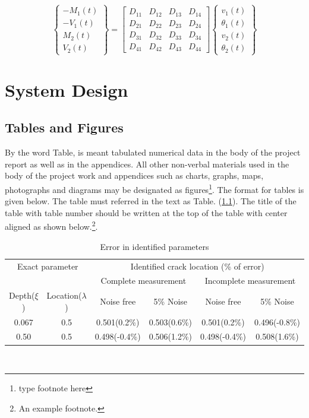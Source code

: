 \documentclass[BTech]{srmuthesis}
\begin{document}
\begin{equation}
\begin{Bmatrix}
-M_1(t)\\
-V_1(t)\\
M_2(t)\\
V_2(t)\end{Bmatrix}=\begin{bmatrix}
D_{11}&D_{12}&D_{13}&D_{14}\\
D_{21}&D_{22}&D_{23}&D_{24}\\
D_{31}&D_{32}&D_{33}&D_{34}\\
D_{41}&D_{42}&D_{43}&D_{44}\end{bmatrix}\begin{Bmatrix}
v_1(t)\\
\theta_1(t)\\
v_2(t)\\
\theta_2(t)\end{Bmatrix}
\label{eq:D}
\end{equation}
\chapter{System Design}
\section{Tables and Figures} 
 By the word Table, is meant tabulated numerical data in the body of the project report as well as in the appendices. All other non-verbal materials used in the body of the project work and appendices such as charts, graphs, maps, photographs and diagrams may be designated as figures\footnote{type footnote here}.
  The format for tables  is given below. The table must referred in the text as Table. (\ref{tab:frmcl}). The title of the table with table number should be written at the top of the table with center aligned as shown below.\footnote{An example footnote.}.
 \begin{table}[htpb]
      \centering
      \caption{Error in identified parameters}
      \begin{tabular}{|c|c|c|c|c|c|}
      	\hline
      	\multicolumn{2}{|c|}{Exact parameter} &               \multicolumn{4}{c|}{Identified crack location (\% of error)}               \\ \cline{3-6}
      	\multicolumn{2}{|c|}{}                & \multicolumn{2}{c|}{Complete measurement} & \multicolumn{2}{|c|}{Incomplete measurement} \\ \hline
      	Depth($\xi$) &  Location($\lambda$)   &  Noise free   &         5\% Noise         &  Noise free   &          5\% Noise           \\ \hline
      	   0.067     &          0.5           & 0.501(0.2\%)  &       0.503(0.6\%)        & 0.501(0.2\%)  &        0.496(-0.8\%)         \\
      	    0.50     &          0.5           & 0.498(-0.4\%) &       0.506(1.2\%)        & 0.498(-0.4\%) &         0.508(1.6\%)         \\ \hline
      \end{tabular}
        \label{tab:frmcl}
      \end{table}\\
      
\end{document}
